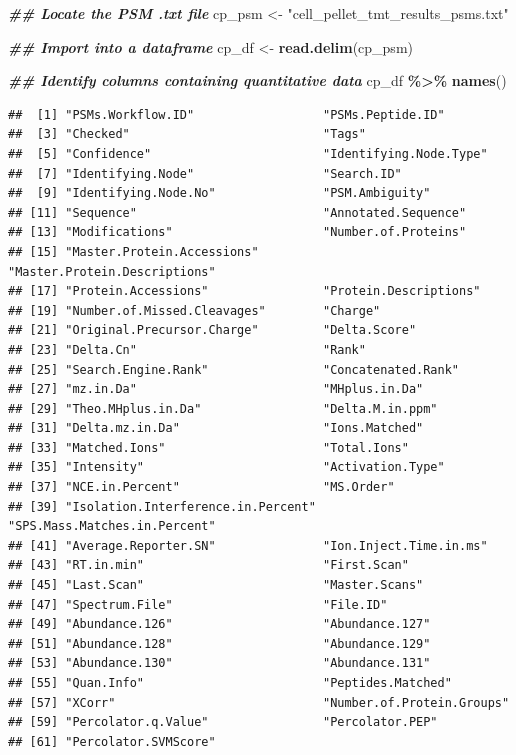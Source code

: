 \documentclass[9pt,a4paper,]{extarticle}
\newenvironment{Shaded}{\begin{snugshade}}{\end{snugshade}}
\newcommand{\DocumentationTok}[1]{\textcolor[rgb]{0.56,0.35,0.01}{\textbf{\textit{#1}}}}
\newcommand{\FunctionTok}[1]{\textcolor[rgb]{0.13,0.29,0.53}{\textbf{#1}}}
\newcommand{\NormalTok}[1]{#1}
\newcommand{\OtherTok}[1]{\textcolor[rgb]{0.56,0.35,0.01}{#1}}
\newcommand{\SpecialCharTok}[1]{\textcolor[rgb]{0.81,0.36,0.00}{\textbf{#1}}}
\newcommand{\StringTok}[1]{\textcolor[rgb]{0.31,0.60,0.02}{#1}}
\begin{document}
\begin{Shaded}
\begin{Highlighting}[]
\DocumentationTok{\#\# Locate the PSM .txt file}
\NormalTok{cp\_psm }\OtherTok{\textless{}{-}} \StringTok{"cell\_pellet\_tmt\_results\_psms.txt"}

\DocumentationTok{\#\# Import into a dataframe}
\NormalTok{cp\_df }\OtherTok{\textless{}{-}} \FunctionTok{read.delim}\NormalTok{(cp\_psm)}

\DocumentationTok{\#\# Identify columns containing quantitative data}
\NormalTok{cp\_df }\SpecialCharTok{\%\textgreater{}\%}
  \FunctionTok{names}\NormalTok{()}
\end{Highlighting}
\end{Shaded}

\begin{verbatim}
##  [1] "PSMs.Workflow.ID"                  "PSMs.Peptide.ID"                  
##  [3] "Checked"                           "Tags"                             
##  [5] "Confidence"                        "Identifying.Node.Type"            
##  [7] "Identifying.Node"                  "Search.ID"                        
##  [9] "Identifying.Node.No"               "PSM.Ambiguity"                    
## [11] "Sequence"                          "Annotated.Sequence"               
## [13] "Modifications"                     "Number.of.Proteins"               
## [15] "Master.Protein.Accessions"         "Master.Protein.Descriptions"      
## [17] "Protein.Accessions"                "Protein.Descriptions"             
## [19] "Number.of.Missed.Cleavages"        "Charge"                           
## [21] "Original.Precursor.Charge"         "Delta.Score"                      
## [23] "Delta.Cn"                          "Rank"                             
## [25] "Search.Engine.Rank"                "Concatenated.Rank"                
## [27] "mz.in.Da"                          "MHplus.in.Da"                     
## [29] "Theo.MHplus.in.Da"                 "Delta.M.in.ppm"                   
## [31] "Delta.mz.in.Da"                    "Ions.Matched"                     
## [33] "Matched.Ions"                      "Total.Ions"                       
## [35] "Intensity"                         "Activation.Type"                  
## [37] "NCE.in.Percent"                    "MS.Order"                         
## [39] "Isolation.Interference.in.Percent" "SPS.Mass.Matches.in.Percent"      
## [41] "Average.Reporter.SN"               "Ion.Inject.Time.in.ms"            
## [43] "RT.in.min"                         "First.Scan"                       
## [45] "Last.Scan"                         "Master.Scans"                     
## [47] "Spectrum.File"                     "File.ID"                          
## [49] "Abundance.126"                     "Abundance.127"                    
## [51] "Abundance.128"                     "Abundance.129"                    
## [53] "Abundance.130"                     "Abundance.131"                    
## [55] "Quan.Info"                         "Peptides.Matched"                 
## [57] "XCorr"                             "Number.of.Protein.Groups"         
## [59] "Percolator.q.Value"                "Percolator.PEP"                   
## [61] "Percolator.SVMScore"
\end{verbatim}
\end{document}
